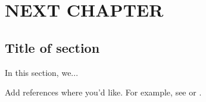 \chapter{NEXT CHAPTER} %

\section{Title of section}
In this section, we...  

Add references where you'd like. For example, see \cite{Author} or \cite{Doe}.


